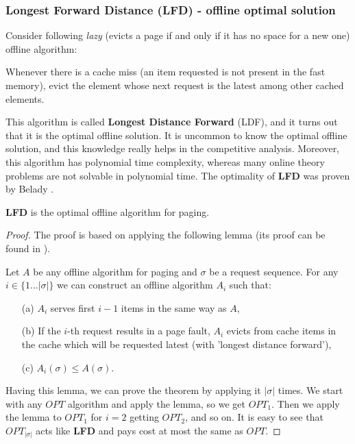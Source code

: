 \subsubsection{Longest Forward Distance (LFD) - offline optimal solution}
Consider following \textit{lazy} (evicts a page if and only if it has no space for a new one) 
offline algorithm: 
\begin{myalgo}
Whenever there is a cache miss (an item requested is not 
present in the fast memory), evict the element whose next request is the latest among other 
cached elements.
\end{myalgo}

This algorithm is called \textbf{Longest Distance Forward} (LDF), and it turns 
out that it is the optimal offline solution. It is uncommon to know the 
optimal offline solution, and this knowledge really helps in the competitive analysis.
Moreover, this algorithm has polynomial 
time complexity, whereas many online theory problems are not solvable in 
polynomial time. The optimality of \textbf{LFD} was proven by Belady 
\cite{LFDBelady}.
\begin{theorem} 
 \textbf{LFD} is the optimal offline algorithm for paging.
\end{theorem}
\begin{proof}
 The proof is based on applying the following lemma (its proof can be found in 
\cite{czarodziej}).
\begin{lemma}
Let $A$ be any offline algorithm for paging and $\sigma$ be a request sequence. For 
any $i \in \{1 \ldots |\sigma|\}$ we can construct an offline algorithm $A_i$ such 
that:
\begin{itemize}
 \item[(a)] $A_i$ serves first $i-1$ items in the same way as $A$,
 \item[(b)] If the $i$-th request results in a page fault, $A_i$ evicts from cache 
items in the cache which will be requested latest (with 'longest distance 
forward'),
  \item[(c)] $A_i(\sigma) \leq A(\sigma)$.
\end{itemize}
\end{lemma}
Having this lemma, we can prove the theorem by applying it $|\sigma|$ times. 
We start with any $OPT$ algorithm and apply the lemma, so we get $OPT_1$. Then 
we apply the lemma to $OPT_1$ for $i=2$ getting $OPT_2$, and so on. It is easy to 
see that $OPT_{|\sigma|}$ acts like \textbf{LFD} and pays cost at most the 
same 
as $OPT$.
\end{proof}

